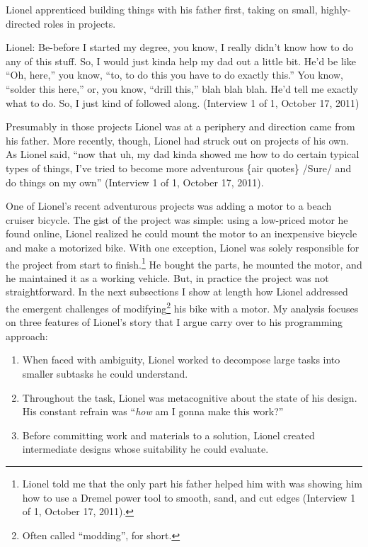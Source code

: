 Lionel apprenticed building things with his father first, taking on
small, highly-directed roles in projects.

Lionel: Be-before I started my degree, you know, I really didn't know
how to do any of this stuff. So, I would just kinda help my dad out a
little bit. He'd be like ``Oh, here,'' you know, ``to, to do this you
have to do exactly this.'' You know, ``solder this here,'' or, you know,
``drill this,'' blah blah blah. He'd tell me exactly what to do. So, I
just kind of followed along. (Interview 1 of 1, October 17, 2011)

Presumably in those projects Lionel was at a periphery and direction
came from his father. More recently, though, Lionel had struck out on
projects of his own. As Lionel said, ``now that uh, my dad kinda showed
me how to do certain typical types of things, I've tried to become
\textbar{}\textbar{}more adventurous\textbar{}\textbar{} \textbar{}\{air
quotes\}\textbar{} /Sure/ and do things on my own'' (Interview 1 of 1,
October 17, 2011).

One of Lionel's recent adventurous projects was adding a motor to a
beach cruiser bicycle. The gist of the project was simple: using a
low-priced motor he found online, Lionel realized he could mount the
motor to an inexpensive bicycle and make a motorized bike. With one
exception, Lionel was solely responsible for the project from start to
finish.\footnote{Lionel told me that the only part his father helped him
  with was showing him how to use a Dremel power tool to smooth, sand,
  and cut edges (Interview 1 of 1, October 17, 2011).} He bought the
parts, he mounted the motor, and he maintained it as a working vehicle.
But, in practice the project was not straightforward. In the next
subsections I show at length how Lionel addressed the emergent
challenges of modifying\footnote{Often called ``modding'', for short.}
his bike with a motor. My analysis focuses on three features of Lionel's
story that I argue carry over to his programming approach:

\begin{enumerate}
\def\labelenumi{\arabic{enumi}.}
\item
  When faced with ambiguity, Lionel worked to decompose large tasks into
  smaller subtasks he could understand.
\item
  Throughout the task, Lionel was metacognitive about the state of his
  design. His constant refrain was ``\emph{how} am I gonna make this
  work?''
\item
  Before committing work and materials to a solution, Lionel created
  intermediate designs whose suitability he could evaluate.
\end{enumerate}

